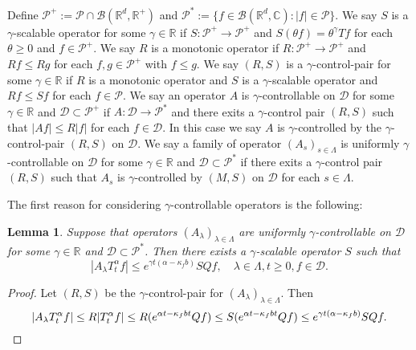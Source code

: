\documentclass[12pt,oneside,english]{amsart}
\theoremstyle{plain}
\newtheorem{lem}[thm]{Lemma}
\theoremstyle{definition}
\numberwithin{equation}{section}
\newcommand{\added}[1]{{\color{blue}#1}}\newcommand{\deleted}[1]{{\color{red}#1}}
\begin{document}
\added{
\subsection{}
    Define $\mathcal P^+:= \mathcal P \cap \mathcal B(\mathbb R^d, \mathbb R^+)$ and $\mathcal P^*:= \{f\in \mathscr B(\mathbb R^d, \mathbb C): |f|\in \mathcal P\}$.
    We say $S$ is a $\gamma$-scalable operator for some $\gamma\in \mathbb R$ if $S: \mathcal P^+ \to \mathcal P^+$ and $S(\theta f) = \theta^\gamma Tf$ for each $\theta \geq 0$ and $f \in \mathcal P^+$.
    We say $R$ is a monotonic operator if $R:\mathcal P^+ \to \mathcal P^+$ and $Rf \leq Rg$ for each $f, g \in \mathcal P^+$ with $f\leq g$.
    We say $(R,S)$ is a $\gamma$-control-pair for some $\gamma \in \mathbb R$ if $R$ is a monotonic operator and $S$ is a $\gamma$-scalable operator and $Rf\leq Sf$ for each $f\in \mathcal P$.
    We say an operator $A$ is $\gamma$-controllable on $\mathcal D$ for some $\gamma \in \mathbb R$ and $\mathcal D \subset \mathcal P^+$ if $A: \mathcal D \to \mathcal P^*$ and there exits a $\gamma$-control pair $(R,S)$ such that $|Af|\leq R|f|$ for each $f\in \mathcal D$.
    In this case we say $A$ is $\gamma$-controlled by the $\gamma$-control-pair $(R,S)$ on $\mathcal D$.
    We say a family of operator $(A_s)_{s\in \Lambda}$ is uniformly $\gamma$-controllable on $\mathcal D$ for some $\gamma \in \mathbb R$ and $\mathcal D \subset \mathcal P^*$ if there exits a $\gamma$-control pair $(R,S)$ such that $A_s$ is $\gamma$-controlled by $(M, S)$ on $\mathcal D$ for each $s\in \Lambda$.
}
\added{
    The first reason for considering $\gamma$-controllable operators is the following:
\begin{lem}
    Suppose that operators $(A_\lambda)_{\lambda\in \Lambda}$ are uniformly $\gamma$-controllable on $\mathcal D$ for some $\gamma \in \mathbb R$ and $\mathcal D \subset \mathcal P^*$.
    Then there exists a $\gamma$-scalable operator $S$ such that
\[
    |A_\lambda T_t^\alpha f|
    \leq e^{\gamma t (\alpha  - \kappa_f b)} SQf,
    \quad \lambda \in \Lambda, t\geq 0, f\in \mathcal D.
\]
\end{lem}
}
\added{
\begin{proof}
    Let $(R,S)$ be the $\gamma$-control-pair for $(A_\lambda)_{\lambda\in \Lambda}$.
    Then
\[
    |A_\lambda T_t^\alpha f| \leq R|T_t^\alpha f|
    \leq R (e^{\alpha t  - \kappa_f bt}Qf)
    \leq S (e^{\alpha t  - \kappa_f bt}Qf)
    \leq e^{\gamma t (\alpha  - \kappa_f b)} SQf.
    \qedhere
\]
\end{proof}
}
\end{document}
